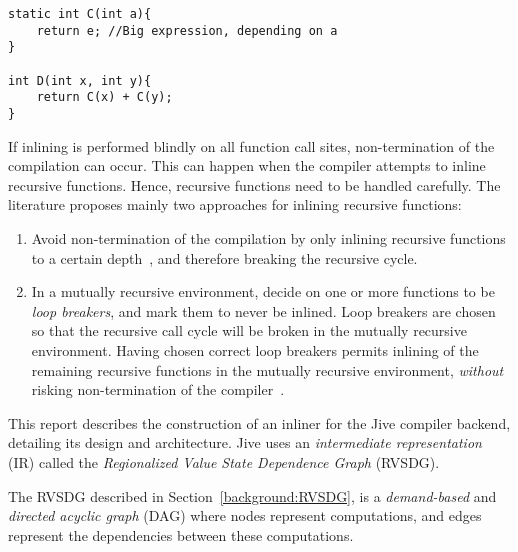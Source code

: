 \begin{centering}
	\noindent\begin{minipage}{\textwidth}
		\begin{CenteredBox}
		\begin{lstlisting}[style=global_customcpp]
static int C(int a){
	return e; //Big expression, depending on a
}

int D(int x, int y){
	return C(x) + C(y);
}
		\end{lstlisting}
		\end{CenteredBox}
	\end{minipage}
	\label{lst:code-dup}
\end{centering}

If inlining is performed blindly on all function call sites, non-termination of
the compilation can occur. This can happen when the compiler attempts to inline
recursive functions. Hence, recursive functions need to be handled carefully.
The literature proposes mainly two approaches for inlining recursive functions:

\begin{enumerate}

	\item Avoid non-termination of the compilation by only inlining recursive
functions to a certain depth~\cite{GHCPaper}\cite{InlineWhenHowSerrano}, and
therefore breaking the recursive cycle.

	\item In a mutually recursive environment, decide on one or more functions
to be \textit{loop breakers}, and mark them to never be inlined. Loop breakers
are chosen so that the recursive call cycle will be broken in the mutually
recursive environment. Having chosen correct loop breakers permits inlining of
the remaining recursive functions in the mutually recursive environment,
\textit{without} risking non-termination of the
compiler~\cite{BasMscThesis}\cite{GHCPaper}.

\end{enumerate}

This report describes the construction of an inliner for the Jive compiler
backend, detailing its design and architecture. Jive uses an
\textit{intermediate representation} (IR) called the \textit{Regionalized Value
State Dependence Graph} (RVSDG)\cite{RVSDG:HiPEACpaper}.

The RVSDG described in Section~\ref{background:RVSDG},
is a \textit{demand-based} and \textit{directed acyclic graph} (DAG) where nodes
represent computations, and edges represent the dependencies between these
computations.

